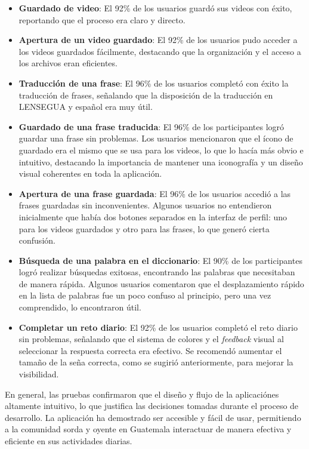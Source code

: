 \begin{itemize}
    
    \item \textbf{Guardado de video}: El 92\% de los usuarios guardó sus videos con éxito, reportando que el proceso era claro y directo.
    \item \textbf{Apertura de un video guardado}: El 92\% de los usuarios pudo acceder a los videos guardados fácilmente, destacando que la organización y el acceso a los archivos eran eficientes.
    \item \textbf{Traducción de una frase}: El 96\% de los usuarios completó con éxito la traducción de frases, señalando que la disposición de la traducción en LENSEGUA y español era muy útil.
    \item \textbf{Guardado de una frase traducida}: El 96\% de los participantes logró guardar una frase sin problemas. Los usuarios mencionaron que el ícono de guardado era el mismo que se usa para los videos, lo que lo hacía más obvio e intuitivo, destacando la importancia de mantener una iconografía y un diseño visual coherentes en toda la aplicación.
    \item \textbf{Apertura de una frase guardada}: El 96\% de los usuarios accedió a las frases guardadas sin inconvenientes. Algunos usuarios no entendieron inicialmente que había dos botones separados en la interfaz de perfil: uno para los videos guardados y otro para las frases, lo que generó cierta confusión.
    \item \textbf{Búsqueda de una palabra en el diccionario}: El 90\% de los participantes logró realizar búsquedas exitosas, encontrando las palabras que necesitaban de manera rápida. Algunos usuarios comentaron que el desplazamiento rápido en la lista de palabras fue un poco confuso al principio, pero una vez comprendido, lo encontraron útil.
    \item \textbf{Completar un reto diario}: El 92\% de los usuarios completó el reto diario sin problemas, señalando que el sistema de colores y el \textit{feedback} visual al seleccionar la respuesta correcta era efectivo. Se recomendó aumentar el tamaño de la seña correcta, como se sugirió anteriormente, para mejorar la visibilidad.
\end{itemize}


En general, las pruebas confirmaron que el diseño y flujo de la aplicaciónes altamente intuitivo, lo que justifica las decisiones tomadas durante el proceso de desarrollo. La aplicación ha demostrado ser accesible y fácil de usar, permitiendo a la comunidad sorda y oyente en Guatemala interactuar de manera efectiva y eficiente en sus actividades diarias.






